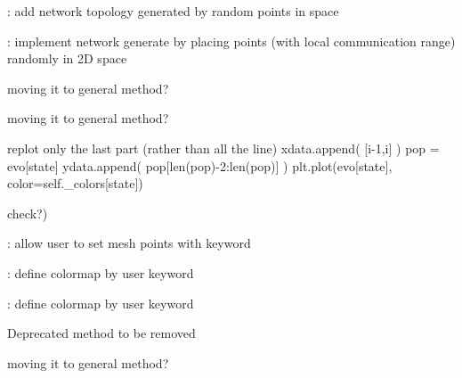 \begin{DoxyRefList}
\item[\label{todo__todo000025}%
\Hypertarget{todo__todo000025}%
Global \hyperlink{class_mu_mo_t_1_1_mu_mo_t_1_1_mu_mo_tmultiagent_controller_a018864aa22d2adb0d3958fb0adbce8e2}{Mu\+Mo\+Tmultiagent\+Controller.\+\_\+progress\+Bar} ]\+: add network topology generated by random points in space  
\item[\label{todo__todo000063}%
\Hypertarget{todo__todo000063}%
Global \hyperlink{class_mu_mo_t_1_1_mu_mo_t_1_1_mu_mo_tmultiagent_view_a8be9986760a86837e04718906d18d596}{Mu\+Mo\+Tmultiagent\+View.\+\_\+positions} ]\+: implement network generate by placing points (with local communication range) randomly in 2D space  
\item[\label{todo__todo000059}%
\Hypertarget{todo__todo000059}%
Global \hyperlink{class_mu_mo_t_1_1_mu_mo_t_1_1_mu_mo_tmultiagent_view_a7c4303b3e2a8784a0cc16cd523069203}{Mu\+Mo\+Tmultiagent\+View.\+\_\+rates\+Dict} ]moving it to general method? 

moving it to general method?  
\item[\label{todo__todo000061}%
\Hypertarget{todo__todo000061}%
Global \hyperlink{class_mu_mo_t_1_1_mu_mo_t_1_1_mu_mo_tmultiagent_view_ae8c8d7969b8ab8f31df9d1d1d10eabb9}{Mu\+Mo\+Tmultiagent\+View.\+\_\+visualisation\+Type} ]replot only the last part (rather than all the line) xdata.\+append( \mbox{[}i-\/1,i\mbox{]} ) pop = evo\mbox{[}state\mbox{]} ydata.\+append( pop\mbox{[}len(pop)-\/2\+:len(pop)\mbox{]} ) plt.\+plot(evo\mbox{[}state\mbox{]}, color=self.\+\_\+colors\mbox{[}state\mbox{]})  
\item[\label{todo__todo000033}%
\Hypertarget{todo__todo000033}%
Global \hyperlink{class_mu_mo_t_1_1_mu_mo_t_1_1_mu_mo_tmulti_controller_a018864aa22d2adb0d3958fb0adbce8e2}{Mu\+Mo\+Tmulti\+Controller.\+\_\+progress\+Bar} ]check?)  
\item[\label{todo__todo000038}%
\Hypertarget{todo__todo000038}%
Global \hyperlink{class_mu_mo_t_1_1_mu_mo_t_1_1_mu_mo_tnoise_view_ac83a924ad62a2461d65b5c9bf9d27453}{Mu\+Mo\+Tnoise\+View.\+\_\+show\+Fixed\+Points} ]\+: allow user to set mesh points with keyword 

\+: define colormap by user keyword 

\+: define colormap by user keyword  
\item[\label{todo__todo000064}%
\Hypertarget{todo__todo000064}%
Global \hyperlink{class_mu_mo_t_1_1_mu_mo_t_1_1_mu_mo_t_s_s_a_view_ac3f09eae4152f838b1693edc4203ee67}{Mu\+Mo\+T\+S\+S\+A\+View.\+\_\+create\+S\+S\+Amatrix} (self)]Deprecated method to be removed  
\item[\label{todo__todo000066}%
\Hypertarget{todo__todo000066}%
Global \hyperlink{class_mu_mo_t_1_1_mu_mo_t_1_1_mu_mo_t_s_s_a_view_a7c4303b3e2a8784a0cc16cd523069203}{Mu\+Mo\+T\+S\+S\+A\+View.\+\_\+rates\+Dict} ]moving it to general method? 


\end{DoxyRefList}
